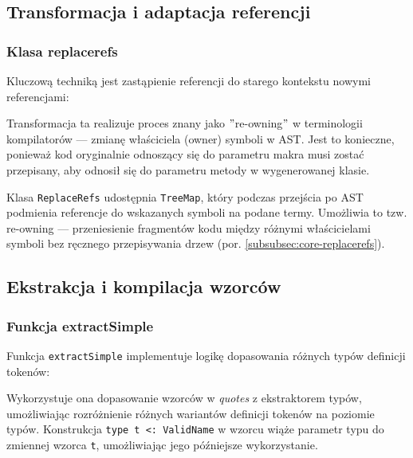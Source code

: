 \subsection{Transformacja i adaptacja referencji}\label{subsec:transformacja-i-adaptacja-referencji}

\subsubsection{Klasa replacerefs}\label{subsubsec:klasa-replacerefs}

Kluczową techniką jest zastąpienie referencji do starego kontekstu nowymi referencjami:



Transformacja ta realizuje proces znany jako \("\)re-owning\("\) w terminologii kompilatorów — zmianę właściciela (owner) symboli w AST. Jest to konieczne, ponieważ kod oryginalnie odnoszący się do parametru makra musi zostać przepisany, aby odnosił się do parametru metody w wygenerowanej klasie.

Klasa \texttt{ReplaceRefs} udostępnia \texttt{TreeMap}, który podczas przejścia po AST podmienia referencje do wskazanych symboli na podane termy.
Umożliwia to tzw. re-owning — przeniesienie fragmentów kodu między różnymi właścicielami symboli bez ręcznego przepisywania drzew (por. \ref{subsubsec:core-replacerefs}).

\subsection{Ekstrakcja i kompilacja wzorców}\label{subsec:ekstrakcja-i-kompilacja-wzorcow}

\subsubsection{Funkcja extractSimple}\label{subsubsec:funkcja-extractsimple}

Funkcja \texttt{extractSimple} implementuje logikę dopasowania różnych typów definicji tokenów:



Wykorzystuje ona dopasowanie wzorców w \textit{quotes} z ekstraktorem typów, umożliwiając rozróżnienie różnych wariantów definicji tokenów na poziomie typów.
Konstrukcja \texttt{type t <: ValidName} w wzorcu wiąże parametr typu do zmiennej wzorca \texttt{t}, umożliwiając jego późniejsze wykorzystanie.

